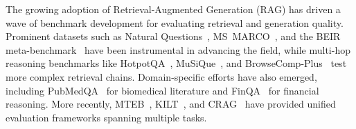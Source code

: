 \documentclass{article}
\begin{document}
The growing adoption of Retrieval-Augmented Generation (RAG) has driven a wave of benchmark development for evaluating retrieval and generation quality. Prominent datasets such as Natural Questions~\citep{kwiatkowski2019natural}, MS~MARCO~\citep{bajaj2018msmarco}, and the BEIR meta-benchmark~\citep{thakur2021beir} have been instrumental in advancing the field, while multi-hop reasoning benchmarks like HotpotQA~\citep{yang2018hotpotqa}, MuSiQue~\citep{trivedi2022musique}, and BrowseComp-Plus~\citep{chen2025browsecomp} test more complex retrieval chains. Domain-specific efforts have also emerged, including PubMedQA~\citep{jin2019pubmedqa} for biomedical literature and FinQA~\citep{chen2021finqa} for financial reasoning. More recently, MTEB~\citep{muennighoff2023mteb}, KILT~\citep{petroni2021kilt}, and CRAG~\citep{yang2024crag} have provided unified evaluation frameworks spanning multiple tasks.
\end{document}
